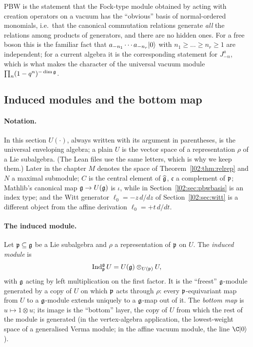\begin{physics}
PBW is the statement that the Fock-type module obtained by acting with creation operators on a
vacuum has the ``obvious'' basis of normal-ordered monomials, i.e.\ that the canonical commutation
relations generate \emph{all} the relations among products of generators, and there are no hidden
ones. For a free boson this is the familiar fact that $a_{-n_1}\cdots a_{-n_r}|0\rangle$ with
$n_1\ge\dots\ge n_r\ge1$ are independent; for a current algebra it is the corresponding statement for
$J^{a}_{-n}$, which is what makes the character of the universal vacuum module
$\prod_n(1-q^n)^{-\dim\mathfrak{g}}$.
\end{physics}

\subsection{Induced modules and the bottom map}\label{l02:sec:induced}

\paragraph{Notation.} In this section $U(\cdot)$, always written with its argument in parentheses, is the
universal enveloping algebra; a plain $U$ is the vector space of a representation $\rho$ of a Lie
subalgebra. (The Lean files use the same letters, which is why we keep them.) Later in the chapter $M$
denotes the space of Theorem~\ref{l02:thm:relrep} and $N$ a maximal submodule; $C$ is the central element
of $\widehat{\mathfrak{g}}$, $\mathfrak c$ a complement of $\mathfrak{p}$; Mathlib's canonical map $\mathfrak{g}\to U(\mathfrak{g})$ is $\iota$,
while  in Section~\ref{l02:sec:pbwbasis} is an index type; and the Witt generator $\ell_0 = -z\,d/dz$
of Section~\ref{l02:sec:witt} is a different object from the affine derivation $\ell_0 = +t\,d/dt$.

\paragraph{The induced module.} Let $\mathfrak{p}\subseteq\mathfrak{g}$ be a Lie subalgebra and $\rho$ a representation of
$\mathfrak{p}$ on $U$. The \emph{induced module} is
\begin{equation*}
 \operatorname{Ind}_{\mathfrak{p}}^{\mathfrak{g}}U = U(\mathfrak{g})\otimes_{U(\mathfrak{p})}U,
\end{equation*}
with $\mathfrak{g}$ acting by left multiplication on the first factor. It is the ``freest'' $\mathfrak{g}$-module
generated by a copy of $U$ on which $\mathfrak{p}$ acts through $\rho$: every $\mathfrak{p}$-equivariant map from $U$
to a $\mathfrak{g}$-module extends uniquely to a $\mathfrak{g}$-map out of it. The \emph{bottom map} is
$u\mapsto1\otimes u$; its image is the ``bottom'' layer, the copy of $U$ from which the rest of the module is
generated (in the vertex-algebra application, the lowest-weight space of a generalised Verma module;
in the affine vacuum module, the line $\C\ltwovac$).

